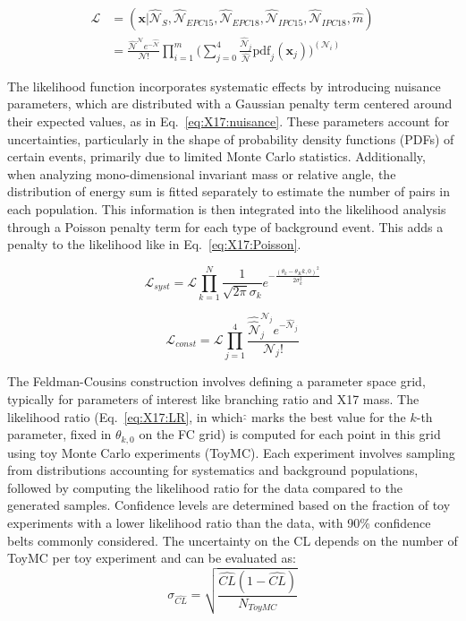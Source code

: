 \begin{refsection}
        \begin{align}
            \mathcal{L} &= (\textbf{x} | \hat{\mathcal{N}}_{S}, \hat{\mathcal{N}}_{EPC15}, \hat{\mathcal{N}}_{EPC18}, \hat{\mathcal{N}}_{IPC15}, \hat{\mathcal{N}}_{IPC18}, \hat{m}) \\
            &= \frac{\hat{\mathcal{N}}^\mathcal{N} e^{-\hat{\mathcal{N}}} }{\mathcal{N}!}  \prod_{i=1}^{m} \Big( \sum_{j=0}^{4} \frac{\hat{\mathcal{N}}_{j}}{\hat{\mathcal{N}}} \text{pdf}_j(\textbf{x}_j)\Big)^{(\mathcal{N}_i)}
            \label{eq:X17:L}
        \end{align}

        \noindent
        The likelihood function incorporates systematic effects by introducing nuisance parameters, which are distributed with a Gaussian penalty term centered around their expected values, as in Eq.~\ref{eq:X17:nuisance}. 
        These parameters account for uncertainties, particularly in the shape of probability density functions (PDFs) of certain events, primarily due to limited Monte Carlo statistics. 
        Additionally, when analyzing mono-dimensional invariant mass or relative angle, the distribution of energy sum is fitted separately to estimate the number of pairs in each population. 
        This information is then integrated into the likelihood analysis through a Poisson penalty term for each type of background event.
        This adds a penalty to the likelihood like in Eq.~\ref{eq:X17:Poisson}.
        
        
        \begin{equation}
        \label{eq:X17:nuisance}
            \mathcal{L}_{syst} = \mathcal{L} \prod_{k=1}^N \frac{1}{\sqrt{2\pi}\sigma_k} e^{-\frac{(\theta_k-\theta_K{k,0})^2}{2\sigma_k^2}}
        \end{equation}

        \begin{equation}
        \label{eq:X17:Poisson}
            \mathcal{L}_{const} = \mathcal{L} \prod_{j=1}^4 \frac{\hat{\hat{\mathcal{N}}}_j^{\mathcal{N}_j}e^{-\hat{\mathcal{N}}_j}}{\mathcal{N}_j!}
        \end{equation}

        \noindent
        The Feldman-Cousins construction involves defining a parameter space grid, typically for parameters of interest like branching ratio and X17 mass. 
        The likelihood ratio (Eq.~\ref{eq:X17:LR}, in which $\hat{\hat{}}$ marks the best value for the $k$-th parameter, fixed in $\theta_{k,0}$ on the FC grid) is computed for each point in this grid using toy Monte Carlo experiments (ToyMC). 
        Each experiment involves sampling from distributions accounting for systematics and background populations, followed by computing the likelihood ratio for the data compared to the generated samples. 
        Confidence levels are determined based on the fraction of toy experiments with a lower likelihood ratio than the data, with 90\% confidence belts commonly considered. 
        The uncertainty on the CL depends on the number of ToyMC per toy experiment and can be evaluated as:
        $$\sigma_{\hat{CL}} = \sqrt{\frac{\hat{CL}(1-\hat{CL})}{N_{ToyMC}}}$$


\end{refsection}
